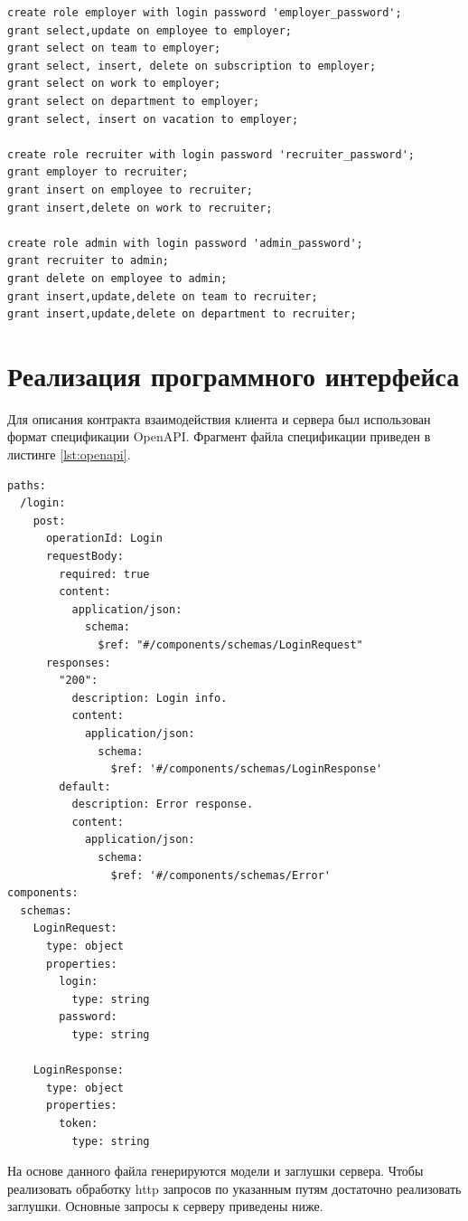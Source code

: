 \newpage

\begin{lstlisting}[label=lst:roles,caption=Скрипт создания ролей для СУБД PostgreSQL]
create role employer with login password 'employer_password';
grant select,update on employee to employer;
grant select on team to employer;
grant select, insert, delete on subscription to employer;
grant select on work to employer;
grant select on department to employer;
grant select, insert on vacation to employer;

create role recruiter with login password 'recruiter_password';
grant employer to recruiter;
grant insert on employee to recruiter;
grant insert,delete on work to recruiter;

create role admin with login password 'admin_password';
grant recruiter to admin;
grant delete on employee to admin;
grant insert,update,delete on team to recruiter;
grant insert,update,delete on department to recruiter;
\end{lstlisting}

\section{Реализация программного интерфейса}
Для описания контракта взаимодействия клиента и сервера был использован формат спецификации OpenAPI. Фрагмент файла спецификации приведен в листинге \ref{lst:openapi}.

\begin{lstlisting}[label=lst:openapi,caption=Вид файла спецификации OpenAPI]
paths:
  /login:
    post:
      operationId: Login
      requestBody:
        required: true
        content:
          application/json:
            schema:
              $ref: "#/components/schemas/LoginRequest"
      responses:
        "200":
          description: Login info.
          content:
            application/json:
              schema:
                $ref: '#/components/schemas/LoginResponse'
        default:
          description: Error response.
          content:
            application/json:
              schema:
                $ref: '#/components/schemas/Error'
components:
  schemas:
    LoginRequest:
      type: object
      properties:
        login:
          type: string
        password:
          type: string

    LoginResponse:
      type: object
      properties:
        token:
          type: string
\end{lstlisting}

На основе данного файла генерируются модели и заглушки сервера. Чтобы реализовать обработку http запросов по указанным путям достаточно реализовать заглушки. Основные запросы к серверу приведены ниже.

